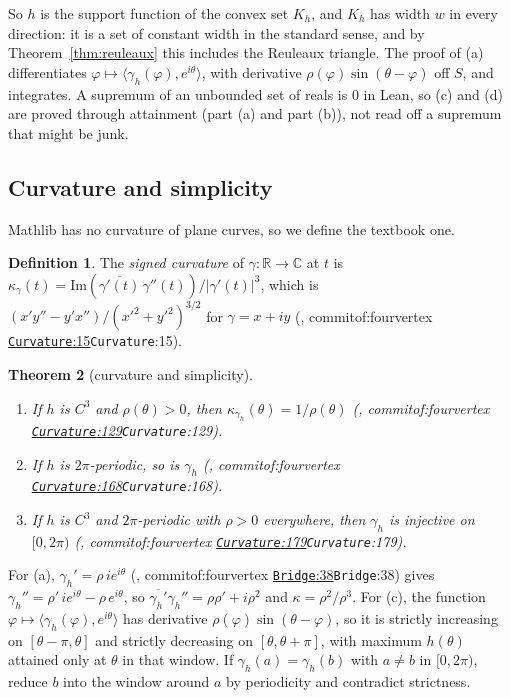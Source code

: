 \documentclass[11pt]{article}
\newtheorem{theorem}{Theorem}
\theoremstyle{definition}
\newtheorem{definition}[theorem]{Definition}
\theoremstyle{remark}
\newcommand{\RR}{\mathbb{R}}
\newcommand{\CC}{\mathbb{C}}
\newcommand{\commitof}[1]{\csname commitof:#1\endcsname}
\newcommand{\repo}[1]{https://github.com/jpbald93/#1}
\newcommand{\src}[4]{\ifcsname commitof:#1\endcsname
  \href{\repo{#1}/blob/\commitof{#1}/#2/#3.lean\#L#4}{\texttt{#3}:#4}\else\texttt{#3}:#4\fi}
\begin{document}
So $h$ is the support function of the convex set $K_h$, and $K_h$ has width $w$ in every direction:
it is a set of constant width in the standard sense, and by Theorem~\ref{thm:reuleaux} this includes
the Reuleaux triangle. The proof of (a) differentiates
$\varphi\mapsto\langle\gamma_h(\varphi), e^{i\theta}\rangle$, with derivative
$\rho(\varphi)\sin(\theta-\varphi)$ off $S$, and integrates. A supremum of an unbounded set of reals
is $0$ in Lean, so (c) and (d) are proved through attainment (part (a) and part (b)), not read off a
supremum that might be junk.

\subsection{Curvature and simplicity}

Mathlib has no curvature of plane curves, so we define the textbook one.

\begin{definition}
The \emph{signed curvature} of $\gamma:\RR\to\CC$ at $t$ is
$\kappa_\gamma(t) = \mathrm{Im}(\overline{\gamma'(t)}\,\gamma''(t))/\lvert\gamma'(t)\rvert^3$, which is
$(x'y''-y'x'')/(x'^2+y'^2)^{3/2}$ for $\gamma = x+iy$ (, \src{fourvertex}{FourVertex}{Curvature}{15}).
\end{definition}

\begin{theorem}[curvature and simplicity]\label{thm:curv}
\begin{enumerate}
\item[(a)] If $h$ is $C^3$ and $\rho(\theta)>0$, then $\kappa_{\gamma_h}(\theta) = 1/\rho(\theta)$
(, \src{fourvertex}{FourVertex}{Curvature}{129}).
\item[(b)] If $h$ is $2\pi$-periodic, so is $\gamma_h$ (, \src{fourvertex}{FourVertex}{Curvature}{168}).
\item[(c)] If $h$ is $C^3$ and $2\pi$-periodic with $\rho>0$ everywhere, then $\gamma_h$ is injective on $[0,2\pi)$
(, \src{fourvertex}{FourVertex}{Curvature}{179}).
\end{enumerate}
\end{theorem}

For (a), $\gamma_h' = \rho\,ie^{i\theta}$ (, \src{fourvertex}{FourVertex}{Bridge}{38}) gives $\gamma_h'' = \rho'\,ie^{i\theta}-\rho\,e^{i\theta}$,
so $\overline{\gamma_h'}\gamma_h'' = \rho\rho'+i\rho^2$ and $\kappa = \rho^2/\rho^3$. For (c), the
function $\varphi\mapsto\langle\gamma_h(\varphi),e^{i\theta}\rangle$ has derivative
$\rho(\varphi)\sin(\theta-\varphi)$, so it is strictly increasing on $[\theta-\pi,\theta]$ and strictly
decreasing on $[\theta,\theta+\pi]$, with maximum $h(\theta)$ attained only at $\theta$ in that
window. If $\gamma_h(a) = \gamma_h(b)$ with $a\ne b$ in $[0,2\pi)$, reduce $b$ into the window around
$a$ by periodicity and contradict strictness.
\end{document}
